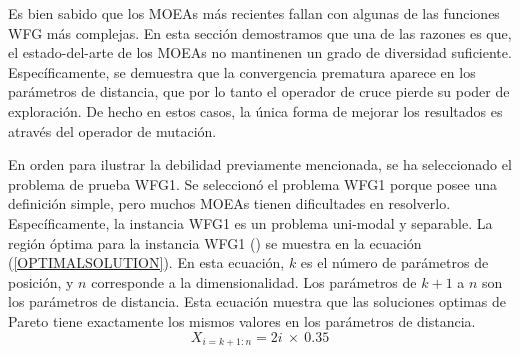 Es bien sabido que los MOEAs más recientes fallan con algunas de las funciones WFG más complejas.
%
En esta sección demostramos que una de las razones es que, el estado-del-arte de los MOEAs no mantinenen un grado de diversidad suficiente.
%
Específicamente, se demuestra que la convergencia prematura aparece en los parámetros de distancia, que por lo tanto el operador de cruce pierde su poder de exploración.
%
De hecho en estos casos, la única forma de mejorar los resultados es através del operador de mutación.


En orden para ilustrar la debilidad previamente mencionada, se ha seleccionado el problema de prueba WFG1.
%
Se seleccionó el problema WFG1 porque posee una definición simple, pero muchos MOEAs tienen dificultades en resolverlo.
%
Específicamente, la instancia WFG1 es un problema uni-modal y separable.
%
La región óptima para la instancia WFG1 (\cite{Joel:WFG}) se muestra en la ecuación (\ref{OPTIMALSOLUTION}).
%
En esta ecuación, $k$ es el número de parámetros de posición, y $n$ corresponde a la dimensionalidad.
%
Los parámetros de $k+1$ a $n$ son los parámetros de distancia.
%
Esta ecuación muestra que las soluciones optimas de Pareto tiene exactamente los mismos valores en los parámetros de distancia.
%
\begin{equation} \label{OPTIMALSOLUTION}
X_{i=k+1:n} =2i\ \times\ 0.35
\end{equation}



